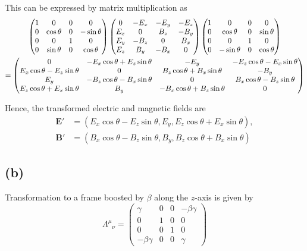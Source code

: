 \documentclass[a4paper,11pt]{article}
\begin{document}
This can be expressed by matrix multiplication as
\begin{gather}
    \begin{pmatrix}
        1 & 0 & 0 & 0 \\
        0 & \cos\theta & 0 & -\sin\theta \\
        0 & 0 & 1 & 0 \\
        0 & \sin\theta & 0 & \cos\theta
    \end{pmatrix}
    \begin{pmatrix}
        0 & -E_x & -E_y & -E_z \\
        E_x & 0 & B_z & -B_y \\
        E_y & -B_z & 0 & B_x \\
        E_z & B_y & -B_x & 0
    \end{pmatrix}
    \begin{pmatrix}
        1 & 0 & 0 & 0 \\
        0 & \cos\theta & 0 & \sin\theta \\
        0 & 0 & 1 & 0 \\
        0 & -\sin\theta & 0 & \cos\theta
    \end{pmatrix}\notag\\
    =\begin{pmatrix}
        0 & -E_x\cos\theta + E_z\sin\theta & -E_y & -E_z\cos\theta - E_x\sin\theta \\
        E_x\cos\theta - E_z\sin\theta & 0 & B_z\cos\theta+B_x\sin\theta & -B_y \\
        E_y & -B_z\cos\theta-B_x\sin\theta & 0 & B_x\cos\theta-B_z\sin\theta \\
        E_z\cos\theta + E_x\sin\theta & B_y & -B_x\cos\theta+B_z\sin\theta & 0
    \end{pmatrix} \label{eq:1a2}
\end{gather}


Hence, the transformed electric and magnetic fields are
\begin{align}
    \mathbf{E}' &= (E_x\cos\theta - E_z\sin\theta, E_y, E_z\cos\theta + E_x\sin\theta), \\
    \mathbf{B}' &= (B_x\cos\theta - B_z\sin\theta, B_y, B_z\cos\theta + B_x\sin\theta)
\end{align}

\subsection{(b)} Transformation to a frame boosted by $\beta$ along the $z$-axis is given by
\begin{equation}
    \Lambda^\mu{}_\nu =
    \begin{pmatrix}
        \gamma & 0 & 0 & -\beta\gamma \\
        0 & 1 & 0 & 0 \\
        0 & 0 & 1 & 0 \\
        -\beta\gamma & 0 & 0 & \gamma
    \end{pmatrix}
\end{equation}
\end{document}
